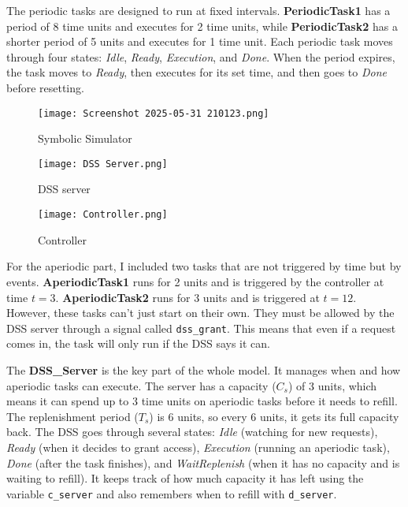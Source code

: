 \documentclass[conference]{IEEEtran}
\begin{document}
The periodic tasks are designed to run at fixed intervals. \textbf{PeriodicTask1} has a period of 8 time units and executes for 2 time units, while \textbf{PeriodicTask2} has a shorter period of 5 units and executes for 1 time unit. Each periodic task moves through four states: \textit{Idle}, \textit{Ready}, \textit{Execution}, and \textit{Done}. When the period expires, the task moves to \textit{Ready}, then executes for its set time, and then goes to \textit{Done} before resetting.
\begin{figure}
    \centering
    \texttt{[image: Screenshot 2025-05-31 210123.png]}
    \caption{Symbolic Simulator}
    \label{fig:enter-label}
\end{figure}
\begin{figure}
    \centering
    \texttt{[image: DSS Server.png]}
    \caption{DSS server}
    \end{figure}
\begin{figure}
    \centering
    \texttt{[image: Controller.png]}
    \caption{Controller}

        \label{fig:enter-label}
\end{figure}
For the aperiodic part, I included two tasks that are not triggered by time but by events. \textbf{AperiodicTask1} runs for 2 units and is triggered by the controller at time $t = 3$. \textbf{AperiodicTask2} runs for 3 units and is triggered at $t = 12$. However, these tasks can’t just start on their own. They must be allowed by the DSS server through a signal called \texttt{dss\_grant}. This means that even if a request comes in, the task will only run if the DSS says it can.

The \textbf{DSS\_Server} is the key part of the whole model. It manages when and how aperiodic tasks can execute. The server has a capacity ($C_s$) of 3 units, which means it can spend up to 3 time units on aperiodic tasks before it needs to refill. The replenishment period ($T_s$) is 6 units, so every 6 units, it gets its full capacity back. The DSS goes through several states: \textit{Idle} (watching for new requests), \textit{Ready} (when it decides to grant access), \textit{Execution} (running an aperiodic task), \textit{Done} (after the task finishes), and \textit{WaitReplenish} (when it has no capacity and is waiting to refill). It keeps track of how much capacity it has left using the variable \texttt{c\_server} and also remembers when to refill with \texttt{d\_server}.
\end{document}
